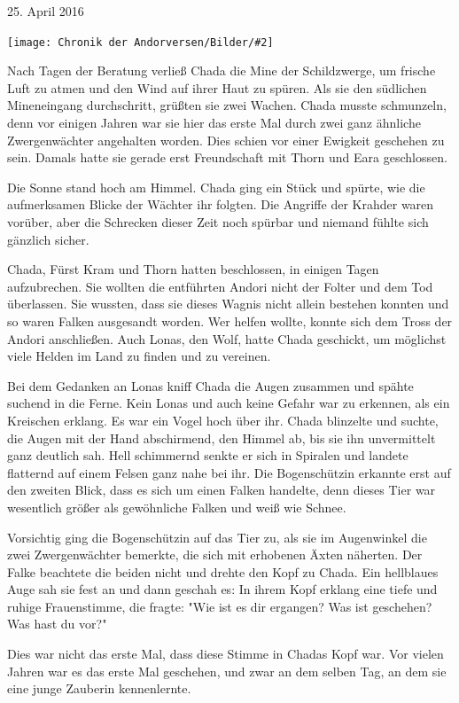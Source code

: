 \documentclass[10pt, a4paper, oneside]{book}
\newcommand{\bildmitts}[2][height=0.32\textwidth,width=0.48\textwidth,keepaspectratio]{%
    \begin{center}
        \texttt{[image: Chronik der Andorversen/Bilder/\#2]}
    \end{center}
}
\begin{document}
\begin{multicols}{2}
\begin{center}
    25. April 2016
\end{center}

\bildmitts{AA2016 Blog 9.jpeg}



Nach Tagen der Beratung verließ Chada die Mine der Schildzwerge, um frische Luft zu atmen und den Wind auf ihrer Haut zu spüren. Als sie den südlichen Mineneingang durchschritt, grüßten sie zwei Wachen. Chada musste schmunzeln, denn vor einigen Jahren war sie hier das erste Mal durch zwei ganz ähnliche Zwergenwächter angehalten worden. Dies schien vor einer Ewigkeit geschehen zu sein. Damals hatte sie gerade erst Freundschaft mit Thorn und Eara geschlossen.

Die Sonne stand hoch am Himmel. Chada ging ein Stück und spürte, wie die aufmerksamen Blicke der Wächter ihr folgten. Die Angriffe der Krahder waren vorüber, aber die Schrecken dieser Zeit noch spürbar und niemand fühlte sich gänzlich sicher.

Chada, Fürst Kram und Thorn hatten beschlossen, in einigen Tagen aufzubrechen. Sie wollten die entführten Andori nicht der Folter und dem Tod überlassen. Sie wussten, dass sie dieses Wagnis nicht allein bestehen konnten und so waren Falken ausgesandt worden. Wer helfen wollte, konnte sich dem Tross der Andori anschließen. Auch Lonas, den Wolf, hatte Chada geschickt, um möglichst viele Helden im Land zu finden und zu vereinen.

Bei dem Gedanken an Lonas kniff Chada die Augen zusammen und spähte suchend in die Ferne. Kein Lonas und auch keine Gefahr war zu erkennen, als ein Kreischen erklang. Es war ein Vogel hoch über ihr. Chada blinzelte und suchte, die Augen mit der Hand abschirmend, den Himmel ab, bis sie ihn unvermittelt ganz deutlich sah. Hell schimmernd senkte er sich in Spiralen und landete flatternd auf einem Felsen ganz nahe bei ihr. Die Bogenschützin erkannte erst auf den zweiten Blick, dass es sich um einen Falken handelte, denn dieses Tier war wesentlich größer als gewöhnliche Falken und weiß wie Schnee.

Vorsichtig ging die Bogenschützin auf das Tier zu, als sie im Augenwinkel die zwei Zwergenwächter bemerkte, die sich mit erhobenen Äxten näherten. Der Falke beachtete die beiden nicht und drehte den Kopf zu Chada. Ein hellblaues Auge sah sie fest an und dann geschah es: In ihrem Kopf erklang eine tiefe und ruhige Frauenstimme, die fragte: "Wie ist es dir ergangen? Was ist geschehen? Was hast du vor?"

Dies war nicht das erste Mal, dass diese Stimme in Chadas Kopf war. Vor vielen Jahren war es das erste Mal geschehen, und zwar an dem selben Tag, an dem sie eine junge Zauberin kennenlernte.


\end{multicols}
\end{document}
